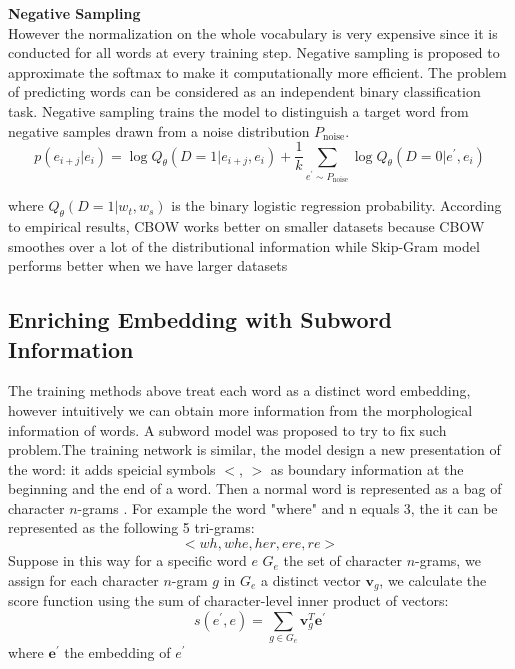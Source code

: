 \textbf{Negative Sampling}\\
However the normalization on the whole vocabulary is very expensive since it is conducted for all words at every training step. Negative sampling is proposed to approximate the softmax to make it computationally more efficient. The problem of predicting words can be considered as an independent binary classification task. Negative sampling trains the model to distinguish a target word from negative samples drawn from a noise  distribution $P_{\text{noise}}$.   
\[p(e_{i+j}|e_i) = \log {Q_{\theta}{(D=1 | e_{i+j}, e_i)}} + \frac{1}{k}\sum_{e^{\prime} \sim P_{\text{noise}}} {\log{Q_{\theta}{(D=0 | e^{\prime}, e_i )}}}  \]

where ${Q_{\theta}{(D=1| w_t, w_s)}}$ is the binary logistic regression probability.
According to  empirical results, CBOW works better on smaller datasets because CBOW smoothes over a lot of the distributional information while Skip-Gram model performs better when we have larger datasets

\subsection{Enriching Embedding with Subword Information}
The training methods above treat each word as a distinct word embedding, however intuitively we can obtain more information from the morphological information of words. A subword model was proposed to try to fix such problem.The training network is similar, the model design a new presentation of the word: it adds speicial symbols $<$, ${>}$ as boundary information at the beginning and the end of a word. Then a normal word is represented as a bag of character $n$-grams . For example the word "where" and n equals 3, the it can be represented as the following 5 tri-grams: 
\[ <wh, whe, her, ere, re>\]
Suppose in this way for a specific word $e$ ${G_{e}}$ the set of character ${n}$-grams, we assign for each character ${n}$-gram $g$ in ${G_{e}}$ a distinct vector $\bm{v}_g$, we calculate the score function using the sum of character-level inner product of vectors:
\[s(e^{\prime}, e) = \sum_{g \in G_{e}} \bm{v}_g^{T} \bm{e}^{\prime} \]
where $\bm{e}^{\prime}$ the embedding of $e^{\prime}$
